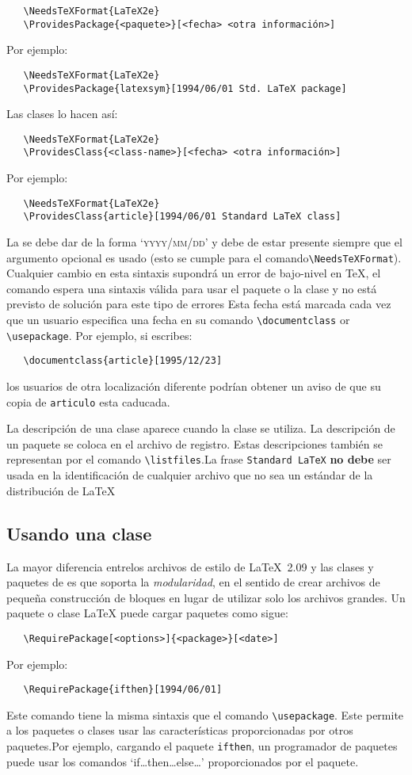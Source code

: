 \begin{verbatim}
   \NeedsTeXFormat{LaTeX2e}
   \ProvidesPackage{<paquete>}[<fecha> <otra información>]
\end{verbatim}
Por ejemplo:
\begin{verbatim}
   \NeedsTeXFormat{LaTeX2e}
   \ProvidesPackage{latexsym}[1994/06/01 Std. LaTeX package]
\end{verbatim}
Las clases lo hacen así:
\begin{verbatim}
   \NeedsTeXFormat{LaTeX2e}
   \ProvidesClass{<class-name>}[<fecha> <otra información>]
\end{verbatim}
Por ejemplo:
\begin{verbatim}
   \NeedsTeXFormat{LaTeX2e}
   \ProvidesClass{article}[1994/06/01 Standard LaTeX class]
\end{verbatim}
La  se debe dar de la forma `\textsc{yyyy/mm/dd}' y debe de estar presente siempre que  el argumento opcional es usado (esto se cumple para el comando\verb|\NeedsTeXFormat|). 
Cualquier cambio en esta sintaxis supondrá un error de bajo-nivel en  \TeX{}, el comando espera una sintaxis válida para usar el paquete o la clase y no está previsto de solución para este tipo de errores
Esta fecha está marcada cada vez que un usuario especifica una fecha en su comando \verb|\documentclass| or \verb|\usepackage|.
Por ejemplo, si escribes:
\begin{verbatim}
   \documentclass{article}[1995/12/23]
\end{verbatim}
los usuarios de otra localización diferente podrían obtener un aviso de que su copia de \verb|articulo| esta caducada.


La descripción de una clase aparece cuando la clase se utiliza. La descripción de un paquete se coloca en el archivo de registro. Estas descripciones también se representan por el comando \verb|\listfiles|.La frase \texttt{Standard LaTeX} \textbf{no debe} ser usada en la identificación de cualquier archivo que no sea un estándar de la distribución de \LaTeX{}

\subsection{Usando una clase}

La mayor diferencia entrelos archivos de estilo de \LaTeX~2.09{} y las clases y paquetes de
\LaTeXe{} es que  \LaTeXe{} soporta la \emph{modularidad}, en el sentido de crear archivos de pequeña construcción de bloques en lugar de utilizar solo los archivos grandes.
Un paquete o clase \LaTeX{} puede cargar paquetes como sigue:
\begin{verbatim}
   \RequirePackage[<options>]{<package>}[<date>]
\end{verbatim}
Por ejemplo:
\begin{verbatim}
   \RequirePackage{ifthen}[1994/06/01]
\end{verbatim}
Este comando tiene la misma sintaxis que el comando \verb|\usepackage|.
Este permite a los paquetes o clases usar las características proporcionadas por otros paquetes.Por ejemplo, cargando el paquete \verb|ifthen|, un programador de paquetes puede usar los comandos `if\dots then\dots else\dots' proporcionados por el paquete.

